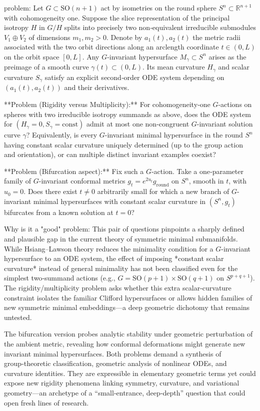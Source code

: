 problem:  
Let \( G \subset \mathrm{SO}(n+1) \) act by isometries on the round sphere \(S^n \subset \mathbb{R}^{n+1}\) with cohomogeneity one.  Suppose the slice representation of the principal isotropy \(H\) in \(G/H\) splits into precisely two non‑equivalent irreducible submodules \(V_1\oplus V_2\) of dimensions \(m_1,m_2>0\).  Denote by \(a_1(t),a_2(t)\) the metric radii associated with the two orbit directions along an arclength coordinate \(t\in(0,L)\) on the orbit space \([0,L]\).  Any \(G\)-invariant hypersurface \(M_\gamma \subset S^n\) arises as the preimage of a smooth curve \(\gamma(t)\subset(0,L)\).  Its mean curvature \(H_\gamma\) and scalar curvature \(S_\gamma\) satisfy an explicit second‑order ODE system depending on \((a_1(t),a_2(t))\) and their derivatives.

**Problem (Rigidity versus Multiplicity):**  
For cohomogeneity‑one \(G\)-actions on spheres with two irreducible isotropy summands as above, does the ODE system for \((H_\gamma=0, S_\gamma=\text{const})\) admit at most one non‑congruent \(G\)-invariant solution curve \(\gamma\)?  
Equivalently, is every \(G\)-invariant minimal hypersurface in the round \(S^n\) having constant scalar curvature uniquely determined (up to the group action and orientation), or can multiple distinct invariant examples coexist?

**Problem (Bifurcation aspect):**  
Fix such a \(G\)-action.  Take a one‑parameter family of \(G\)-invariant conformal metrics \(g_t=e^{2u_t}g_{\mathrm{round}}\) on \(S^n\), smooth in \(t\), with \(u_0=0\).  Does there exist \(t\neq0\) arbitrarily small for which a new branch of \(G\)-invariant minimal hypersurfaces with constant scalar curvature in \((S^n,g_t)\) bifurcates from a known solution at \(t=0\)? 

Why is it a "good" problem:  
This pair of questions pinpoints a sharply defined and plausible gap in the current theory of symmetric minimal submanifolds.  While Hsiang–Lawson theory reduces the minimality condition for a \(G\)-invariant hypersurface to an ODE system, the effect of imposing *constant scalar curvature* instead of general minimality has not been classified even for the simplest two‑summand actions (e.g., \(G=\mathrm{SO}(p+1)\times\mathrm{SO}(q+1)\) on \(S^{p+q+1}\)).  The rigidity/multiplicity problem asks whether this extra scalar‑curvature constraint isolates the familiar Clifford hypersurfaces or allows hidden families of new symmetric minimal embeddings—a deep geometric dichotomy that remains untested.  

The bifurcation version probes analytic stability under geometric perturbation of the ambient metric, revealing how conformal deformations might generate new invariant minimal hypersurfaces.  Both problems demand a synthesis of group‑theoretic classification, geometric analysis of nonlinear ODEs, and curvature identities.  They are expressible in elementary geometric terms yet could expose new rigidity phenomena linking symmetry, curvature, and variational geometry—an archetype of a “small‑entrance, deep‑depth” question that could open fresh lines of research.